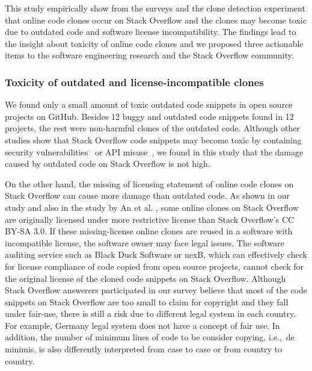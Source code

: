 \documentclass[10pt,journal,compsoc]{IEEEtran}
\begin{document}

This study empirically show from the surveys and the clone detection experiment that
online code clones occur on Stack Overflow and the clones may become toxic due
to outdated code and software license incompatibility. The findings lead to the
insight about toxicity of online code clones and we proposed three actionable items
to the software engineering research and the Stack Overflow community.

\subsubsection{Toxicity of outdated and license-incompatible clones}
We found only a small amount of toxic outdated code snippets in open source projects on
GitHub. Besides 12 buggy and outdated code snippets found in 12 projects, the
rest were non-harmful clones of the outdated code. Although other studies show
that Stack Overflow code snippets may become toxic by containing security
vulnerabilities~\cite{Acar2016,Fischer2017} or API misuse~\cite{Zhang2018}, we
found in this study that the damage caused by outdated code on Stack
Overflow is not high.

On the other hand, the missing of licensing statement of online code clones on
Stack Overflow can cause more damage than outdated code. As shown in our study and
also in the study by An et al. \cite{An2017}, some online clones on Stack Overflow are
originally licensed under more restrictive license than Stack Overflow's CC
BY-SA 3.0. If these missing-license online clones are reused in a software with
incompatible license, the software owner may face legal issues. The software
auditing service such as Black Duck Software or nexB, which can effectively
check for license compliance of code copied from open source projects, cannot
check for the original license of the cloned code snippets on Stack Overflow. Although
Stack Overflow answerers participated in our survey believe that most of the
code snippets on Stack Overflow are too small to claim for copyright and they
fall under fair-use, there is still a risk due to different legal system in each
country. For example, Germany legal system does not have a concept of fair use.
In addition, the number of minimum lines of code to be consider copying, i.e.,~de minimis,
is also differently interpreted from case to case or from country to country.
\end{document}
